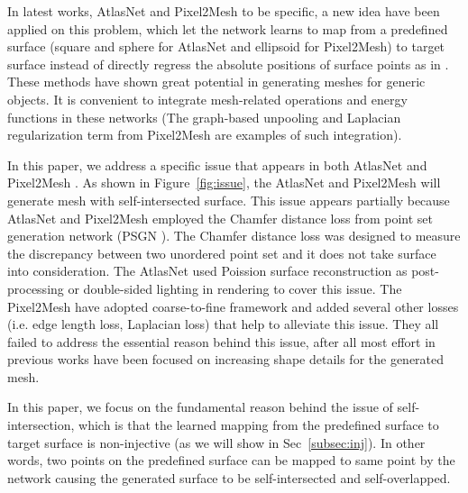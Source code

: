 In latest works, AtlasNet \cite{atlasnet} and Pixel2Mesh \cite{pixel2mesh} to be specific, a new idea have been applied on this problem, which let the network learns to map from a predefined surface (square and sphere for AtlasNet and ellipsoid for Pixel2Mesh) to target surface instead of directly regress the absolute positions of surface points as in \cite{PSGN}. These methods have shown great potential in generating meshes for generic objects. It is convenient to integrate mesh-related operations and energy functions in these networks (The graph-based unpooling and Laplacian regularization term from Pixel2Mesh are examples of such integration).

In this paper, we address a specific issue that appears in both AtlasNet \cite{atlasnet} and Pixel2Mesh \cite{pixel2mesh}. As shown in Figure~\ref{fig:issue}, the AtlasNet and Pixel2Mesh will generate mesh with self-intersected surface. This issue appears partially because AtlasNet and Pixel2Mesh employed the Chamfer distance loss from point set generation network (PSGN \cite{PSGN}). The Chamfer distance loss was designed to measure the discrepancy between two unordered point set and it does not take surface into consideration. The AtlasNet used Poission surface reconstruction as post-processing or double-sided lighting in rendering to cover this issue. The Pixel2Mesh have adopted coarse-to-fine framework and added several other losses (i.e. edge length loss, Laplacian loss) that help to alleviate this issue. They all failed to address the essential reason behind this issue, after all most effort in previous works have been focused on increasing shape details for the generated mesh.

In this paper, we focus on the fundamental reason behind the issue of self-intersection, which is that the learned mapping from the predefined surface to target surface is non-injective (as we will show in Sec~\ref{subsec:inj}). In other words, two points on the predefined surface can be mapped to same point by the network causing the generated surface to be self-intersected and self-overlapped. 


